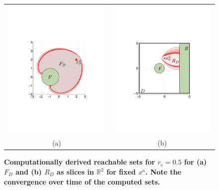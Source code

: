 \documentclass[letterpaper, 10 pt, conference]{ieeeconf}  %
\numberwithin{algorithm}{section}
\newcommand{\R}{\mathbb{R}}
\begin{document}
\begin{figure}[tb]
	\centering
\begin{tabular}{cc}
\includegraphics[width=0.45\linewidth]{figures/FC45.pdf} &
\includegraphics[width=0.45\linewidth]{figures/FR45.pdf} \\
(a) & (b) \\
\end{tabular}
\caption{\textbf{Computationally derived reachable sets for $r_c = 0.5$ for (a) $F_D$ and (b) $R_D$ as slices in $\R^2$ for fixed $x^a$.  Note the convergence over time of the computed sets.}}
\label{fig:compareBothResults}
\end{figure}
\end{document}
